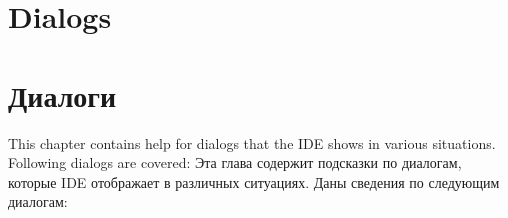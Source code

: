 \ifenglish
\chapter{Dialogs}
\else
\chapter{Диалоги}
\fi
\label{dialogs}

\ifenglish
This chapter contains help for dialogs that the IDE shows in various situations.
Following dialogs are covered:
\else
Эта глава содержит подсказки по диалогам, которые IDE отображает в различных 
ситуациях. Даны сведения по следующим диалогам:
\fi








